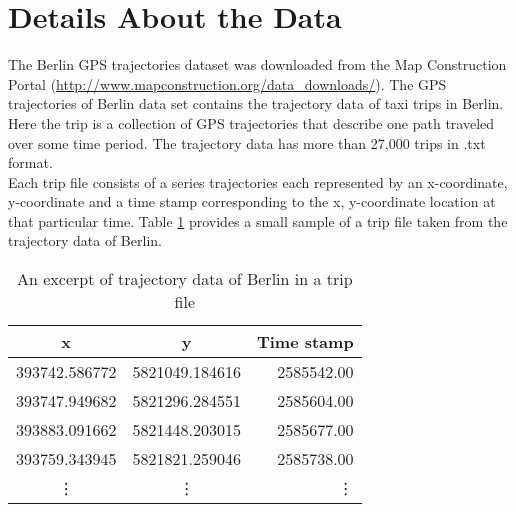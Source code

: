 \documentclass[11pt]{article}
\begin{document}
\section*{Details About the Data}
The Berlin GPS trajectories dataset was downloaded from the Map Construction Portal (\url{http://www.mapconstruction.org/data_downloads/}). 
The GPS trajectories of Berlin data set contains the trajectory data of taxi trips in Berlin. Here the trip is a collection of GPS trajectories that describe one path traveled over some time period. The trajectory data has more than 27,000 trips in .txt format. \\
Each trip file consists of a series trajectories each represented by an x-coordinate, y-coordinate and a time stamp corresponding to the x, y-coordinate location at that particular time. Table \ref{table:questions} provides a small sample of a trip file taken from the trajectory data of Berlin.
\begin{table}
\begin{center}
\begin{tabular}{ |c |c| r| }
\hline
  x & y & Time stamp   \\ \hline
  393742.586772 & 5821049.184616 & 2585542.00   \\ \hline
  393747.949682 & 5821296.284551 & 2585604.00 \\  \hline
  393883.091662 & 5821448.203015 & 2585677.00  \\ \hline
  393759.343945 & 5821821.259046 & 2585738.00\\ \hline
  \vdots & \vdots & \vdots \\ \hline
\end{tabular}
\end{center}
\caption{An excerpt of trajectory data of Berlin in a trip file}
\label{table:questions}
\end{table}


\pagebreak
\end{document}
